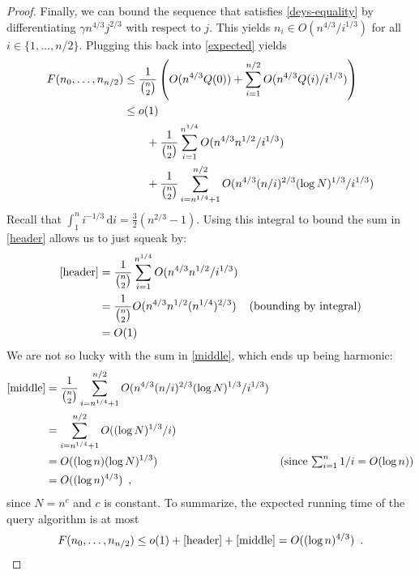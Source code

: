 \documentclass{patmorin}
\begin{document}
\begin{proof}
  Finally, we can bound the sequence that satisfies \eqref{deys-equality}
  by differentiating $\gamma n^{4/3}j^{2/3}$ with respect to $j$.
  This yields $n_i \in O(n^{4/3}/i^{1/3})$ for all $i\in\{1,\ldots,n/2\}$.
  Plugging this back into \eqref{expected} yields
  \begin{align}
     F(n_0,\ldots,n_{n/2}) 
      & \le \frac{1}{\binom{n}{2}}\left(O(n^{4/3}Q(0))+\sum_{i=1}^{n/2} O(n^{4/3}Q(i)/i^{1/3})\right) \notag \\
      & \le o(1) \notag \\
      & \qquad {} + \frac{1}{\binom{n}{2}}\sum_{i=1}^{n^{1/4}} O(n^{4/3}n^{1/2}/i^{1/3})  \eqlabel{header}\\
      & \qquad {} + \frac{1}{\binom{n}{2}}\sum_{i=n^{1/4}+1}^{n/2}O(n^{4/3}(n/i)^{2/3}(\log N)^{1/3}/i^{1/3}) \eqlabel{middle} 
  \end{align}
  Recall that $\int_1^n i^{-1/3}\,\mathrm{d}i = \frac{3}{2}(n^{2/3}-1)$.
  Using this integral to bound the sum in \eqref{header}
  allows us to just squeak by:
  \begin{align*}
    \eqref{header} & = \frac{1}{\binom{n}{2}}\sum_{i=1}^{n^{1/4}} O(n^{4/3}n^{1/2}/i^{1/3}) \\
        & = \frac{1}{\binom{n}{2}}O(n^{4/3}n^{1/2}(n^{1/4})^{2/3})
           & \text{(bounding by integral)}  \\
        & = O(1) \\
  \end{align*}
  We are not so lucky with the sum in \eqref{middle}, which ends up
  being harmonic:
  \begin{align*}
    \eqref{middle} 
      & = \frac{1}{\binom{n}{2}}\sum_{i=n^{1/4}+1}^{n/2}O(n^{4/3}(n/i)^{2/3}(\log N)^{1/3}/i^{1/3}) \\
      & = 
       \sum_{i=n^{1/4}+1}^{n/2}O((\log N)^{1/3}/i) \\
      & = O((\log n)(\log N)^{1/3})  & \mbox{(since $\sum_{i=1}^n 1/i=O(\log n)$)} \\
      & = O((\log n)^{4/3}) \enspace ,
  \end{align*}
  since $N=n^c$ and $c$ is constant.
  To summarize, the expected running time of the query algorithm is at most
  \[ 
     F(n_0,\ldots,n_{n/2}) \le o(1)+\eqref{header} + \eqref{middle} 
     = O((\log n)^{4/3}) \enspace . \qedhere
  \]
\end{proof}
\end{document}
